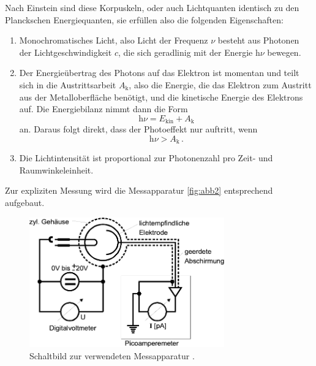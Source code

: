Nach Einstein sind diese Korpuskeln, oder auch Lichtquanten identisch zu den Planckschen Energiequanten,
sie erfüllen also die folgenden Eigenschaften:

\begin{enumerate}
    \item Monochromatisches Licht, also Licht der Frequenz $\nu$ besteht aus Photonen der Lichtgeschwindigkeit $c$,
            die sich geradlinig mit der Energie $\text{h}\nu$ bewegen.
    \item Der Energieübertrag des Photons auf das Elektron ist momentan und teilt sich in die Austrittsarbeit $A_\text{k}$, 
            also die Energie, die das Elektron zum Austritt aus der Metalloberfläche benötigt, 
            und die kinetische Energie des Elektrons auf. Die Energiebilanz nimmt dann die 
            Form
            \begin{equation}
                \text{h} \nu = E_\text{kin} + A_\text{k}
                \label{eq:energiebilanz}
            \end{equation}
            an.
            Daraus folgt direkt, dass der Photoeffekt nur auftritt, wenn
            \begin{equation*}
                \text{h} \nu > A_\text{k} \,.
            \end{equation*}
    \item Die Lichtintensität ist proportional zur Photonenzahl pro Zeit- und Raumwinkeleinheit.
\end{enumerate}


Zur expliziten Messung wird die Messapparatur \autoref{fig:abb2} entsprechend aufgebaut.

\begin{figure}[H]
    \centering
    \includegraphics[width=0.75\textwidth]{figures/Abb2.pdf}
    \caption{Schaltbild zur verwendeten Messapparatur \cite{ap10}.}
    \label{fig:abb2}
\end{figure}

